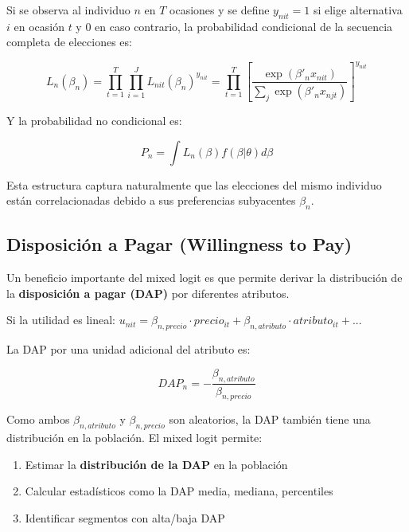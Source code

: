 \documentclass[
]{book}
\providecommand{\tightlist}{%
  \setlength{\itemsep}{0pt}\setlength{\parskip}{0pt}}
\begin{document}
Si se observa al individuo \(n\) en \(T\) ocasiones y se define \(y_{nit} = 1\) si elige alternativa \(i\) en ocasión \(t\) y 0 en caso contrario, la probabilidad condicional de la secuencia completa de elecciones es:

\begin{equation}
L_n(\beta_n) = \prod_{t=1}^T \prod_{i=1}^J L_{nit}(\beta_n)^{y_{nit}} = \prod_{t=1}^T \left[\frac{\exp(\beta'_n x_{nit})}{\sum_j \exp(\beta'_n x_{njt})}\right]^{y_{nit}}
\label{eq:seqprob}
\end{equation}

Y la probabilidad no condicional es:

\begin{equation}
P_n = \int L_n(\beta) f(\beta|\theta) d\beta
\label{eq:panelprob}
\end{equation}

Esta estructura captura naturalmente que las elecciones del mismo individuo están correlacionadas debido a sus preferencias subyacentes \(\beta_n\).

\subsection{Disposición a Pagar (Willingness to Pay)}\label{disposiciuxf3n-a-pagar-willingness-to-pay}

Un beneficio importante del mixed logit es que permite derivar la distribución de la \textbf{disposición a pagar (DAP)} por diferentes atributos.

Si la utilidad es lineal: \(u_{nit} = \beta_{n,precio} \cdot precio_{it} + \beta_{n,atributo} \cdot atributo_{it} + ...\)

La DAP por una unidad adicional del atributo es:

\begin{equation}
DAP_n = -\frac{\beta_{n,atributo}}{\beta_{n,precio}}
\label{eq:wtp}
\end{equation}

Como ambos \(\beta_{n,atributo}\) y \(\beta_{n,precio}\) son aleatorios, la DAP también tiene una distribución en la población. El mixed logit permite:

\begin{enumerate}
\def\labelenumi{\arabic{enumi}.}
\tightlist
\item
  Estimar la \textbf{distribución de la DAP} en la población
\item
  Calcular estadísticos como la DAP media, mediana, percentiles
\item
  Identificar segmentos con alta/baja DAP
\end{enumerate}
\end{document}
